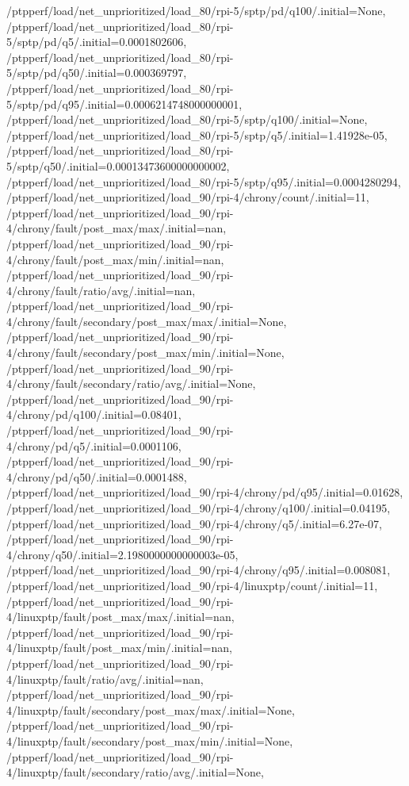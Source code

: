 {    /ptpperf/load/net_unprioritized/load_80/rpi-5/sptp/pd/q100/.initial=None,
    /ptpperf/load/net_unprioritized/load_80/rpi-5/sptp/pd/q5/.initial=0.0001802606,
    /ptpperf/load/net_unprioritized/load_80/rpi-5/sptp/pd/q50/.initial=0.000369797,
    /ptpperf/load/net_unprioritized/load_80/rpi-5/sptp/pd/q95/.initial=0.0006214748000000001,
    /ptpperf/load/net_unprioritized/load_80/rpi-5/sptp/q100/.initial=None,
    /ptpperf/load/net_unprioritized/load_80/rpi-5/sptp/q5/.initial=1.41928e-05,
    /ptpperf/load/net_unprioritized/load_80/rpi-5/sptp/q50/.initial=0.00013473600000000002,
    /ptpperf/load/net_unprioritized/load_80/rpi-5/sptp/q95/.initial=0.0004280294,
    /ptpperf/load/net_unprioritized/load_90/rpi-4/chrony/count/.initial=11,
    /ptpperf/load/net_unprioritized/load_90/rpi-4/chrony/fault/post_max/max/.initial=nan,
    /ptpperf/load/net_unprioritized/load_90/rpi-4/chrony/fault/post_max/min/.initial=nan,
    /ptpperf/load/net_unprioritized/load_90/rpi-4/chrony/fault/ratio/avg/.initial=nan,
    /ptpperf/load/net_unprioritized/load_90/rpi-4/chrony/fault/secondary/post_max/max/.initial=None,
    /ptpperf/load/net_unprioritized/load_90/rpi-4/chrony/fault/secondary/post_max/min/.initial=None,
    /ptpperf/load/net_unprioritized/load_90/rpi-4/chrony/fault/secondary/ratio/avg/.initial=None,
    /ptpperf/load/net_unprioritized/load_90/rpi-4/chrony/pd/q100/.initial=0.08401,
    /ptpperf/load/net_unprioritized/load_90/rpi-4/chrony/pd/q5/.initial=0.0001106,
    /ptpperf/load/net_unprioritized/load_90/rpi-4/chrony/pd/q50/.initial=0.0001488,
    /ptpperf/load/net_unprioritized/load_90/rpi-4/chrony/pd/q95/.initial=0.01628,
    /ptpperf/load/net_unprioritized/load_90/rpi-4/chrony/q100/.initial=0.04195,
    /ptpperf/load/net_unprioritized/load_90/rpi-4/chrony/q5/.initial=6.27e-07,
    /ptpperf/load/net_unprioritized/load_90/rpi-4/chrony/q50/.initial=2.1980000000000003e-05,
    /ptpperf/load/net_unprioritized/load_90/rpi-4/chrony/q95/.initial=0.008081,
    /ptpperf/load/net_unprioritized/load_90/rpi-4/linuxptp/count/.initial=11,
    /ptpperf/load/net_unprioritized/load_90/rpi-4/linuxptp/fault/post_max/max/.initial=nan,
    /ptpperf/load/net_unprioritized/load_90/rpi-4/linuxptp/fault/post_max/min/.initial=nan,
    /ptpperf/load/net_unprioritized/load_90/rpi-4/linuxptp/fault/ratio/avg/.initial=nan,
    /ptpperf/load/net_unprioritized/load_90/rpi-4/linuxptp/fault/secondary/post_max/max/.initial=None,
    /ptpperf/load/net_unprioritized/load_90/rpi-4/linuxptp/fault/secondary/post_max/min/.initial=None,
    /ptpperf/load/net_unprioritized/load_90/rpi-4/linuxptp/fault/secondary/ratio/avg/.initial=None,
}

